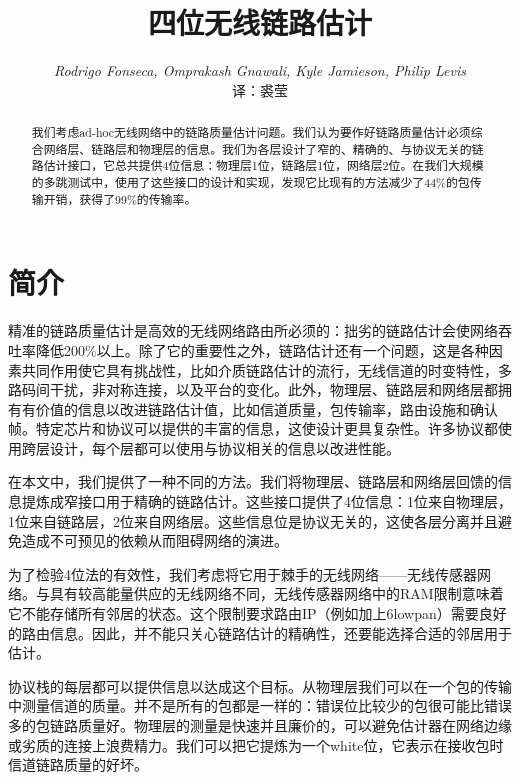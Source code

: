 \documentclass[12pt,a4paper]{article}
\title{\textsf{四位无线链路估计}}
\author{
\textit{\small Rodrigo Fonseca, Omprakash Gnawali, Kyle Jamieson, Philip Levis}\\
{\kai 译\song ：\kai 裘莹}}
\date{}
\begin{document}
\sloppy


\newpage
\maketitle

\xiaosi\song

\begin{abstract}
  我们考虑ad-hoc无线网络中的链路质量估计问题。我们认为要作好链路质量估计必须综合网络层、链路层和物理层的信息。我们为各层设计了窄的、精确的、与协议无关的链路估计接口，它总共提供4位信息：物理层1位，链路层1位，网络层2位。在我们大规模的多跳测试中，使用了这些接口的设计和实现，发现它比现有的方法减少了44\%的包传输开销，获得了99\%的传输率。
\end{abstract}

\fontsize{12pt}{13pt}\selectfont

\section{简介}
  精准的链路质量估计是高效的无线网络路由所必须的：拙劣的链路估计会使网络吞吐率降低200\%以上。除了它的重要性之外，链路估计还有一个问题，这是各种因素共同作用使它具有挑战性，比如介质链路估计的流行，无线信道的时变特性，多路码间干扰，非对称连接，以及平台的变化。此外，物理层、链路层和网络层都拥有有价值的信息以改进链路估计值，比如信道质量，包传输率，路由设施和确认帧。特定芯片和协议可以提供的丰富的信息，这使设计更具复杂性。许多协议都使用{\kai 跨层}设计，每个层都可以使用与协议相关的信息以改进性能。

在本文中，我们提供了一种不同的方法。我们将物理层、链路层和网络层回馈的信息提炼成窄接口用于精确的链路估计。这些接口提供了4位信息：1位来自物理层，1位来自链路层，2位来自网络层。这些信息位是协议无关的，这使各层分离并且避免造成不可预见的依赖从而阻碍网络的演进。

为了检验4位法的有效性，我们考虑将它用于棘手的无线网络——无线传感器网络。与具有较高能量供应的无线网络不同，无线传感器网络中的RAM限制意味着它不能存储所有邻居的状态。这个限制要求路由IP（例如加上6lowpan）需要良好的路由信息。因此，并不能只关心链路估计的精确性，还要能选择合适的邻居用于估计。

协议栈的每层都可以提供信息以达成这个目标。从物理层我们可以在一个包的传输中测量信道的质量。并不是所有的包都是一样的：错误位比较少的包很可能比错误多的包链路质量好。物理层的测量是快速并且廉价的，可以避免估计器在网络边缘或劣质的连接上浪费精力。我们可以把它提炼为一个white位，它表示在接收包时信道链路质量的好坏。
\end{document}
